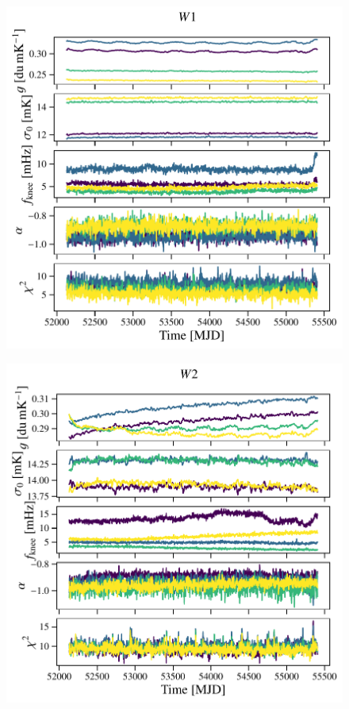 \documentclass[twocolumn]{../../common/aa}
\begin{document}
\begin{figure}
	\centering
	\includegraphics[width=\columnwidth]{figures/inst_090-WMAP_W1.pdf}
\end{figure}
\begin{figure}
	\centering
	\includegraphics[width=\columnwidth]{figures/inst_090-WMAP_W2.pdf}
\end{figure}
\end{document}
